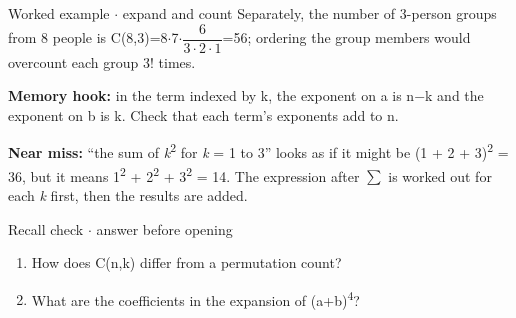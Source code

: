 \documentclass[11pt]{article}
\begin{document}
\begin{keepsection}
\begin{workedbox}{Worked example \ensuremath{\cdot} expand and count}
Separately, the number of 3-person groups from 8 people is C(8,3)=8\ensuremath{\cdot}7\ensuremath{\cdot}{\small\ensuremath{\dfrac{6}{3\cdot 2\cdot 1}}}=56; ordering the group members would overcount each group 3! times.
\end{workedbox}

\begin{notebox}\textbf{Memory hook:} in the term indexed by k, the exponent on a is n\ensuremath{-}k and the exponent on b is k. Check that each term’s exponents add to n.\end{notebox}

\begin{notebox}\textbf{Near miss:} “the sum of \textit{k}\textsuperscript{2} for \textit{k} = 1 to 3” looks as if it might be (1 + 2 + 3)\textsuperscript{2} = 36, but it means 1\textsuperscript{2} + 2\textsuperscript{2} + 3\textsuperscript{2} = 14. The expression after \ensuremath{\textstyle\sum} is worked out for each \textit{k} first, then the results are added.\end{notebox}

\begin{recallbox}{Recall check \ensuremath{\cdot} answer before opening}
\begin{enumerate}
\item How does C(n,k) differ from a permutation count?
\item What are the coefficients in the expansion of (a+b)\textsuperscript{4}?
\end{enumerate}

\end{recallbox}
\end{keepsection}
\end{document}
